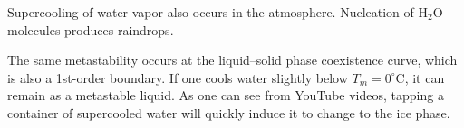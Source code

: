 Supercooling of water vapor also occurs in the atmosphere. Nucleation of H$_2$O molecules produces raindrops.

The same metastability occurs at the liquid--solid phase coexistence curve, which is also a 1st-order boundary. If one
cools water slightly below $T_m = 0^\circ$C, it can remain as a metastable liquid. As one can see from YouTube videos,
tapping a container of supercooled water will quickly induce it to change to the ice phase.
